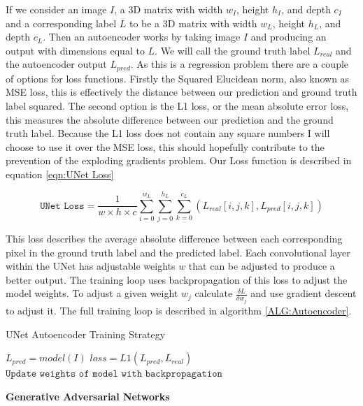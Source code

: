 \documentclass{UoYCSproject}
\begin{document}
If we consider an image $ I $, a 3D matrix with width $ w_I $, height $ h_I $, and depth $ c_I $ and a corresponding label $ L $ to be a 3D matrix with width $ w_L $, height $ h_L $, and depth $ c_L $. Then an autoencoder works by taking image $ I $ and producing an output with dimensions equal to $ L $. We will call the ground truth label $ L_{real} $ and the autoencoder output $ L_{pred} $. As this is a regression problem there are a couple of options for loss functions. Firstly the Squared Elucidean norm, also known as MSE loss, this is effectively the distance between our prediction and ground truth label squared. The second option is the L1 loss, or the mean absolute error loss, this measures the absolute difference between our prediction and the ground truth label.
Because the L1 loss does not contain any square numbers I will choose to use it over the MSE loss, this should hopefully contribute to the prevention of the exploding gradients problem. Our Loss function is described in equation \ref{eqn:UNet Loss}

\begin{equation}
    \label{eqn:UNet Loss}
    \texttt{UNet Loss} = \frac{1}{w \times h \times c} \sum_{i = 0}^{w_L} \sum_{j = 0}^{h_L} \sum_{k = 0}^{c_L}(L_{real}[i,j,k], L_{pred}[i,j,k] ) 
\end{equation}

This loss describes the average absolute difference between each corresponding pixel in the ground truth label and the predicted label. Each convolutional layer within the UNet has adjustable weights $w$ that can be adjusted to produce a better output. The training loop uses backpropagation of this loss to adjust the model weights. To adjust a given weight $w_j$ calculate $ \frac{\delta L}{\delta w_j} $ and use gradient descent to adjust it. The full training loop is described in algorithm \ref{ALG:Autoencoder}.

\begin{algorithm}
\caption{UNet Autoencoder Training Strategy}\label{ALG:Autoencoder}
\begin{algorithmic}[1]
\State
\State $L_{pred} = model(I)$
\State $loss = L1( L_{pred}, L_{real} ) $
\State $\texttt{Update weights of model with backpropagation}$
\State
\EndFor
\EndFor
\end{algorithmic}
\end{algorithm}

\textbf{Generative Adversarial Networks}
\end{document}
